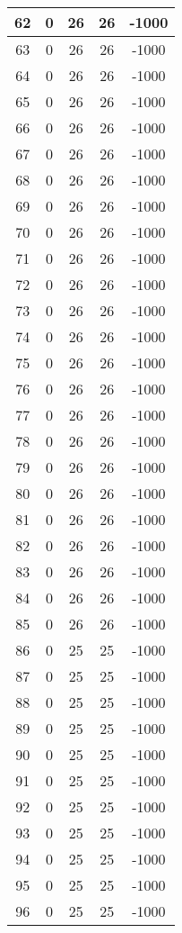 \documentclass[letterpaper, 12pt]{article}
\begin{document}
\begin{longtable}{|c|c|c|c|c|}
\hline
62 & 0 & 26 & 26 & -1000 \\
\hline
63 & 0 & 26 & 26 & -1000 \\
\hline
64 & 0 & 26 & 26 & -1000 \\
\hline
65 & 0 & 26 & 26 & -1000 \\
\hline
66 & 0 & 26 & 26 & -1000 \\
\hline
67 & 0 & 26 & 26 & -1000 \\
\hline
68 & 0 & 26 & 26 & -1000 \\
\hline
69 & 0 & 26 & 26 & -1000 \\
\hline
70 & 0 & 26 & 26 & -1000 \\
\hline
71 & 0 & 26 & 26 & -1000 \\
\hline
72 & 0 & 26 & 26 & -1000 \\
\hline
73 & 0 & 26 & 26 & -1000 \\
\hline
74 & 0 & 26 & 26 & -1000 \\
\hline
75 & 0 & 26 & 26 & -1000 \\
\hline
76 & 0 & 26 & 26 & -1000 \\
\hline
77 & 0 & 26 & 26 & -1000 \\
\hline
78 & 0 & 26 & 26 & -1000 \\
\hline
79 & 0 & 26 & 26 & -1000 \\
\hline
80 & 0 & 26 & 26 & -1000 \\
\hline
81 & 0 & 26 & 26 & -1000 \\
\hline
82 & 0 & 26 & 26 & -1000 \\
\hline
83 & 0 & 26 & 26 & -1000 \\
\hline
84 & 0 & 26 & 26 & -1000 \\
\hline
85 & 0 & 26 & 26 & -1000 \\
\hline
86 & 0 & 25 & 25 & -1000 \\
\hline
87 & 0 & 25 & 25 & -1000 \\
\hline
88 & 0 & 25 & 25 & -1000 \\
\hline
89 & 0 & 25 & 25 & -1000 \\
\hline
90 & 0 & 25 & 25 & -1000 \\
\hline
91 & 0 & 25 & 25 & -1000 \\
\hline
92 & 0 & 25 & 25 & -1000 \\
\hline
93 & 0 & 25 & 25 & -1000 \\
\hline
94 & 0 & 25 & 25 & -1000 \\
\hline
95 & 0 & 25 & 25 & -1000 \\
\hline
96 & 0 & 25 & 25 & -1000 \\

\end{longtable}
\end{document}
